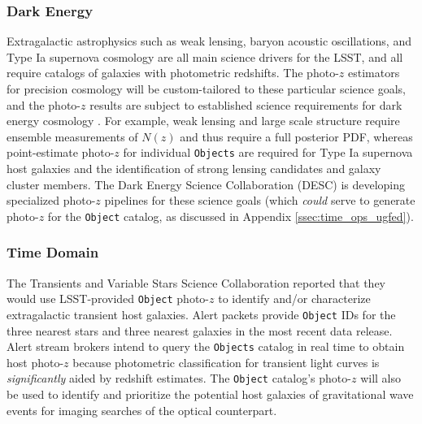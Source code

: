 \documentclass[DM,lsstdraft,toc]{lsstdoc}
\begin{document}
\subsubsection{Dark Energy}\label{sssec:use_sci_de}
Extragalactic astrophysics such as weak lensing, baryon acoustic oscillations, and Type Ia supernova cosmology are all main science drivers for the LSST, and all require catalogs of galaxies with photometric redshifts.
The photo-$z$ estimators for precision cosmology will be custom-tailored to these particular science goals, and the photo-$z$ results are subject to established science requirements for dark energy cosmology \citep{2018arXiv180901669T}.
For example, weak lensing and large scale structure require ensemble measurements of $N(z)$ and thus require a full posterior PDF, whereas point-estimate photo-$z$ for individual {\tt Objects} are required for Type Ia supernova host galaxies and the identification of strong lensing candidates and galaxy cluster members. 
The Dark Energy Science Collaboration (DESC) is developing specialized photo-$z$ pipelines for these science goals (which {\it could} serve to generate photo-$z$ for the {\tt Object} catalog, as discussed in Appendix \ref{ssec:time_ops_ugfed}).

\subsubsection{Time Domain}\label{sssec:use_sci_td}
The Transients and Variable Stars Science Collaboration reported that they would use LSST-provided {\tt Object} photo-$z$ to identify and/or characterize extragalactic transient host galaxies.
Alert packets provide {\tt Object} IDs for the three nearest stars and three nearest galaxies in the most recent data release.
Alert stream brokers intend to query the {\tt Objects} catalog in real time to obtain host photo-$z$ because photometric classification for transient light curves is {\it significantly} aided by redshift estimates.
The {\tt Object} catalog's photo-$z$ will also be used to identify and prioritize the potential host galaxies of gravitational wave events for imaging searches of the optical counterpart.
\end{document}
